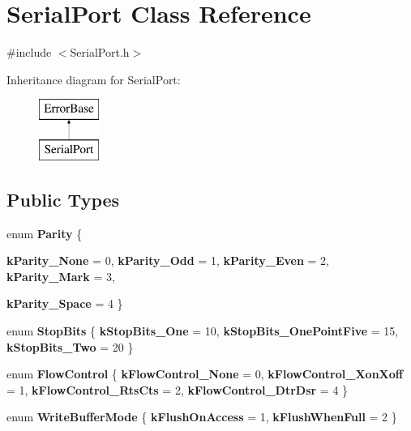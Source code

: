 \hypertarget{classSerialPort}{
\section{SerialPort Class Reference}
\label{classSerialPort}
}


{\ttfamily \#include $<$SerialPort.h$>$}

Inheritance diagram for SerialPort:\begin{figure}[H]
\begin{center}
\leavevmode
\includegraphics[height=2.000000cm]{classSerialPort}
\end{center}
\end{figure}
\subsection*{Public Types}
\begin{DoxyCompactItemize}
\item 
enum {\bfseries Parity} \{ \par
{\bfseries kParity\_\-None} = 0, 
{\bfseries kParity\_\-Odd} = 1, 
{\bfseries kParity\_\-Even} = 2, 
{\bfseries kParity\_\-Mark} = 3, 
\par
{\bfseries kParity\_\-Space} = 4
 \}
\item 
enum {\bfseries StopBits} \{ {\bfseries kStopBits\_\-One} = 10, 
{\bfseries kStopBits\_\-OnePointFive} = 15, 
{\bfseries kStopBits\_\-Two} = 20
 \}
\item 
enum {\bfseries FlowControl} \{ {\bfseries kFlowControl\_\-None} = 0, 
{\bfseries kFlowControl\_\-XonXoff} = 1, 
{\bfseries kFlowControl\_\-RtsCts} = 2, 
{\bfseries kFlowControl\_\-DtrDsr} = 4
 \}
\item 
enum {\bfseries WriteBufferMode} \{ {\bfseries kFlushOnAccess} = 1, 
{\bfseries kFlushWhenFull} = 2
 \}
\end{DoxyCompactItemize}
